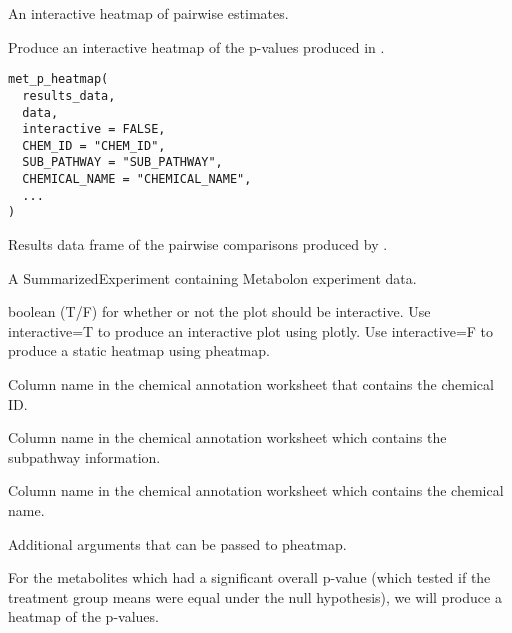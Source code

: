 \documentclass[a4paper]{book}
\begin{document}
%
\begin{Value}
An interactive heatmap of pairwise estimates.
\end{Value}
%
\begin{Description}
Produce an interactive heatmap of the p-values produced in
.
\end{Description}
%
\begin{Usage}
\begin{verbatim}
met_p_heatmap(
  results_data,
  data,
  interactive = FALSE,
  CHEM_ID = "CHEM_ID",
  SUB_PATHWAY = "SUB_PATHWAY",
  CHEMICAL_NAME = "CHEMICAL_NAME",
  ...
)
\end{verbatim}
\end{Usage}
%
\begin{Arguments}
\begin{ldescription}
\item[\code{results\_data}] Results data frame of the pairwise comparisons produced
by .

\item[\code{data}] A SummarizedExperiment containing Metabolon experiment data.

\item[\code{interactive}] boolean (T/F) for whether or not the plot should be
interactive. Use interactive=T to produce an interactive plot using
plotly. Use interactive=F to produce a static heatmap using pheatmap.

\item[\code{CHEM\_ID}] Column name in the chemical annotation worksheet that contains
the chemical ID.

\item[\code{SUB\_PATHWAY}] Column name in the chemical annotation worksheet which
contains the subpathway information.

\item[\code{CHEMICAL\_NAME}] Column name in the chemical annotation worksheet which
contains the chemical name.

\item[\code{...}] Additional arguments that can be passed to pheatmap.
\end{ldescription}
\end{Arguments}
%
\begin{Details}
For the metabolites which had a significant overall p-value (which tested if
the treatment group means were equal under the null hypothesis), we will
produce a heatmap of the p-values.
\end{Details}
\end{document}
